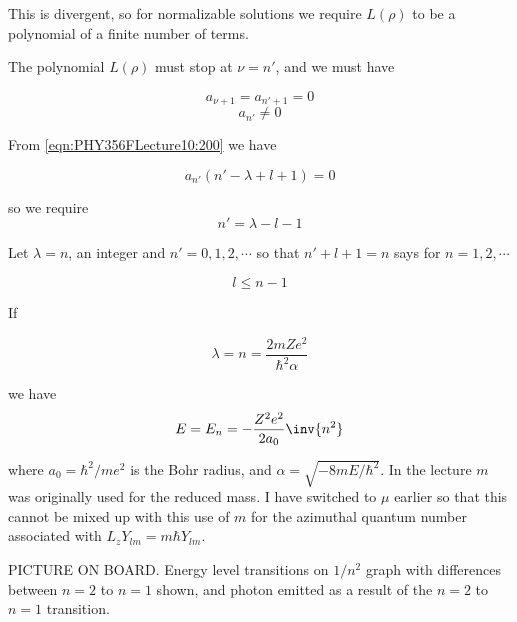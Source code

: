 This is divergent, so for normalizable solutions we require $L(\rho)$ to be a polynomial of a finite number of terms.

The polynomial $L(\rho)$ must stop at $\nu = n'$, and we must have

\begin{equation}\label{eqn:PHY356FLecture10:260}
a_{\nu+1} = a_{n' +1} = 0
\end{equation}
\begin{equation}\label{eqn:PHY356FLecture10:270}
a_{n'} \ne 0
\end{equation}

From \ref{eqn:PHY356FLecture10:200} we have

\begin{equation}\label{eqn:PHY356FLecture10:200a}
a_{n'} \left(
n' - \lambda + l + 1
\right)
=0
\end{equation}

so we require
\begin{equation}\label{eqn:PHY356FLecture10:280}
n' = \lambda - l - 1
\end{equation}

Let $\lambda = n$, an integer and $n' = 0, 1, 2, \cdots$ so that $n' + l + 1 = n$ says for $n= 1,2, \cdots$

\begin{equation}\label{eqn:PHY356FLecture10:290}
l \le n-1
\end{equation}

If

\begin{equation}\label{eqn:PHY356FLecture10:300}
\lambda = n = \frac{2 m Z e^2 }{\hbar^2 \alpha}
\end{equation}

we have
\begin{equation}\label{eqn:PHY356FLecture10:310}
E = E_n = - \frac{Z^2 e^2 }{2 a_0} \inv{n^2}
\end{equation}

where $a_0 = \hbar^2/m e^2$ is the Bohr radius, and $\alpha = \sqrt{-8 m E/\hbar^2}$.  In the lecture $m$ was originally used for the reduced mass.  I have switched to $\mu$ earlier so that this cannot be mixed up with this use of $m$ for the azimuthal quantum number associated with $L_z Y_{lm} = m \hbar Y_{lm}$.

PICTURE ON BOARD.  Energy level transitions on $1/n^2$ graph with differences between $n=2$ to $n=1$ shown, and photon emitted as a result of the $n=2$ to $n=1$ transition.

